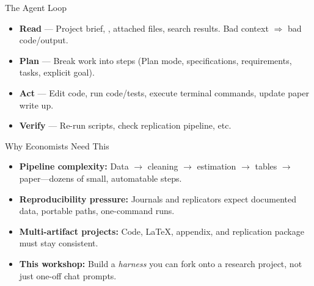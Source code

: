\begin{frame}{The Agent Loop}
  \begin{center}
  \end{center}
  \vspace{0.35em}
  {\small
  \begin{itemize}
    \item \textbf{Read} \textnormal{--- Project brief, , attached files, search results. Bad context $\Rightarrow$ bad code/output.}
    \item \textbf{Plan} \textnormal{--- Break work into steps (Plan mode, specifications, requirements, tasks, explicit goal).}
    \item \textbf{Act} \textnormal{--- Edit code, run code/tests, execute terminal commands, update paper write up.}
    \item \textbf{Verify} \textnormal{--- Re-run scripts, check replication pipeline, etc.}
  \end{itemize}}
\end{frame}

\begin{frame}{Why Economists Need This}
  \begin{itemize}
    \item \textbf{Pipeline complexity:} \textnormal{Data $\to$ cleaning $\to$ estimation $\to$ tables $\to$ paper---dozens of small, automatable steps.}
    \item \textbf{Reproducibility pressure:} \textnormal{Journals and replicators expect documented data, portable paths, one-command runs.}
    \item \textbf{Multi-artifact projects:} \textnormal{Code, LaTeX, appendix, and replication package must stay consistent.}
    \item \textbf{This workshop:} \textnormal{Build a \emph{harness} you can fork onto a research project, not just one-off chat prompts.}
  \end{itemize}
\end{frame}

